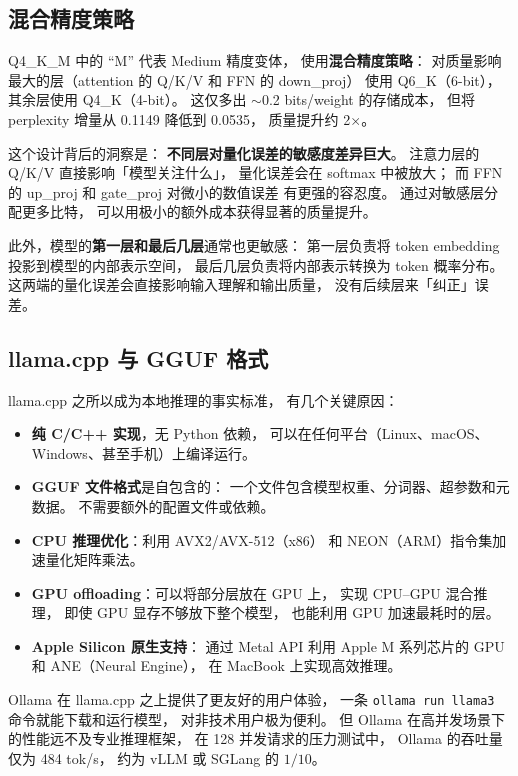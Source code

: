 \subsection{混合精度策略}

Q4\_K\_M 中的 “M” 代表 Medium 精度变体，
使用\textbf{混合精度策略}：
对质量影响最大的层（attention 的 Q/K/V 和 FFN 的 down\_proj）
使用 Q6\_K（6-bit），
其余层使用 Q4\_K（4-bit）。
这仅多出 $\sim$0.2 bits/weight 的存储成本，
但将 perplexity 增量从 0.1149 降低到 0.0535，
质量提升约 2$\times$。

这个设计背后的洞察是：
\textbf{不同层对量化误差的敏感度差异巨大}。
注意力层的 Q/K/V 直接影响「模型关注什么」，
量化误差会在 softmax 中被放大；
而 FFN 的 up\_proj 和 gate\_proj 对微小的数值误差
有更强的容忍度。
通过对敏感层分配更多比特，
可以用极小的额外成本获得显著的质量提升。

此外，模型的\textbf{第一层和最后几层}通常也更敏感：
第一层负责将 token embedding 投影到模型的内部表示空间，
最后几层负责将内部表示转换为 token 概率分布。
这两端的量化误差会直接影响输入理解和输出质量，
没有后续层来「纠正」误差。

\subsection{llama.cpp 与 GGUF 格式}

llama.cpp 之所以成为本地推理的事实标准，
有几个关键原因：
\begin{itemize}[noitemsep]
  \item \textbf{纯 C/C++ 实现}，无 Python 依赖，
        可以在任何平台（Linux、macOS、Windows、甚至手机）上编译运行。
  \item \textbf{GGUF 文件格式}是自包含的：
        一个文件包含模型权重、分词器、超参数和元数据。
        不需要额外的配置文件或依赖。
  \item \textbf{CPU 推理优化}：利用 AVX2/AVX-512（x86）
        和 NEON（ARM）指令集加速量化矩阵乘法。
  \item \textbf{GPU offloading}：可以将部分层放在 GPU 上，
        实现 CPU--GPU 混合推理，
        即使 GPU 显存不够放下整个模型，
        也能利用 GPU 加速最耗时的层。
  \item \textbf{Apple Silicon 原生支持}：
        通过 Metal API 利用 Apple M 系列芯片的 GPU 和 ANE（Neural Engine），
        在 MacBook 上实现高效推理。
\end{itemize}

Ollama 在 llama.cpp 之上提供了更友好的用户体验，
一条 \texttt{ollama run llama3} 命令就能下载和运行模型，
对非技术用户极为便利。
但 Ollama 在高并发场景下的性能远不及专业推理框架，
在 128 并发请求的压力测试中，
Ollama 的吞吐量仅为 484 tok/s，
约为 vLLM 或 SGLang 的 $1/10$。


